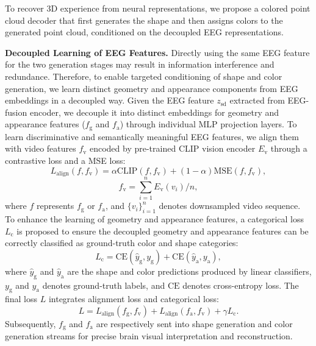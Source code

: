 To recover 3D experience from neural representations, we propose a colored point cloud decoder that first generates the shape and then assigns colors to the generated point cloud, conditioned on the decoupled EEG representations.


{\textbf{Decoupled Learning of EEG Features.}}
Directly using the same EEG feature for the two generation stages may result in information interference and redundance.
Therefore, to enable targeted conditioning 
of shape and color generation,   
we learn distinct geometry
and appearance components from EEG embeddings in a decoupled way.
Given the EEG feature $z_\mathrm{sd}$ extracted from EEG-fusion encoder, we decouple it into distinct embeddings for geometry and appearance features ($f_\mathrm{g}$ and $f_\mathrm{a}$) through individual MLP projection layers. 
To learn discriminative and semantically meaningful EEG features, 
we align them with video features $f_\mathrm{v}$ encoded by pre-trained CLIP vision encoder $E_\mathrm{v}$ through a contrastive loss and a MSE loss:
\begin{equation}
	L_{\mathrm{align}}(f, f_\mathrm{v})=\alpha \mathrm{CLIP}(f, f_\mathrm{v})+(1-\alpha)\mathrm{MSE}(f, f_\mathrm{v}),
	\label{alpha}
\end{equation}
\begin{equation}    f_\mathrm{v}={\sum_{i=1}^nE_\mathrm{v}(v_i)}/{n},
\end{equation}
where $f$ represents $f_\mathrm{g}$ or $f_\mathrm{a}$, and $\{v_i\}_{i=1}^n$ denotes downsampled video sequence. 
To enhance the learning of geometry and appearance features, a categorical loss $L_{\mathrm{c}}$ is proposed to ensure the decoupled geometry and appearance features can be correctly classified as ground-truth color and shape categories:
\begin{equation}
	L_{\mathrm{c}}=\mathrm{CE}(\hat{y}_\mathrm{g}, y_\mathrm{g})+\mathrm{CE}(\hat{y}_\mathrm{a}, y_\mathrm{a}),
\end{equation}
where $\hat{y}_\mathrm{g}$ and $\hat{y}_\mathrm{a}$ are the shape and color predictions produced by linear classifiers, $y_\mathrm{g}$ and $ y_\mathrm{a}$ denotes ground-truth labels, and $\mathrm{CE}$ denotes cross-entropy loss.
The final loss $L$ integrates alignment loss and categorical loss:
\begin{equation}
	L=L_{\mathrm{align}}(f_\mathrm{g},f_\mathrm{v})+L_{\mathrm{align}}(f_\mathrm{a},f_\mathrm{v})+\gamma L_{\mathrm{c}}.
	\label{gamma}
\end{equation}
Subsequently, $f_\mathrm{g}$ and $f_\mathrm{a}$ are respectively sent into shape generation and color generation streams for precise brain visual interpretation and reconstruction.


